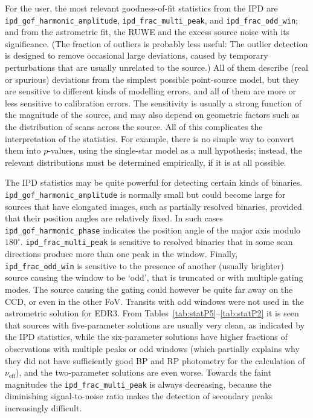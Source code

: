 \documentclass[longauth]{aa} %
\newcommand{\gacs}[1]{{\footnotesize\texttt{#1}}}
\begin{document}
For the user, the most relevant goodness-of-fit statistics from the IPD are 
\gacs{ipd\_gof\_harmonic\_amplitude}, \gacs{ipd\_frac\_multi\_peak}, and 
\gacs{ipd\_frac\_odd\_win}; and from the astrometric fit, the RUWE and the 
excess source noise with its significance. (The fraction of outliers is probably 
less useful: The outlier detection is designed to remove occasional large deviations, 
caused by temporary perturbations that are usually unrelated to the source.)
All of them describe (real or spurious) deviations from the simplest possible point-source 
model, but they are sensitive to different kinds of modelling errors, and all of them are more
or less sensitive to calibration errors. The sensitivity is usually a strong function 
of the magnitude of the source, and may also depend on geometric factors such as the 
distribution of scans across the source. All of this complicates the interpretation of the 
statistics. For example, there is no simple way to convert them into $p$-values, using the 
single-star model as a null hypothesis; instead, the relevant distributions must be 
determined empirically, if it is at all possible.
 
The IPD statistics may be quite powerful for detecting certain kinds of binaries.
\gacs{ipd\_gof\_harmonic\_amplitude} is normally small but could become large
for sources that have elongated images, such as partially resolved binaries, provided
that their position angles are relatively fixed. In such cases \gacs{ipd\_gof\_harmonic\_phase} 
indicates the position angle of the major axis modulo $180^\circ$. 
\gacs{ipd\_frac\_multi\_peak} is sensitive to resolved binaries that in some scan
directions produce more than one peak in the window. Finally, \gacs{ipd\_frac\_odd\_win} 
is sensitive to the presence of another (usually brighter) source causing the window to be 
`odd', that is truncated or with multiple gating modes. The source causing the gating
could however be quite far away on the CCD, or even in the other FoV. Transits with 
odd windows were not used in the astrometric solution for EDR3.
From Tables~\ref{tab:statP5}--\ref{tab:statP2} it is seen that sources with 
five-parameter solutions are usually very clean, as indicated by the IPD statistics,
while the six-parameter solutions have higher fractions of observations with 
multiple peaks or odd windows (which partially explains why they did not
have sufficiently good BP and RP photometry for the calculation of $\nu_\text{eff}$), 
and the two-parameter solutions are even worse. Towards the faint magnitudes the 
\gacs{ipd\_frac\_multi\_peak} is always decreasing, because the diminishing 
signal-to-noise ratio makes the detection of secondary peaks increasingly difficult.
\end{document}
